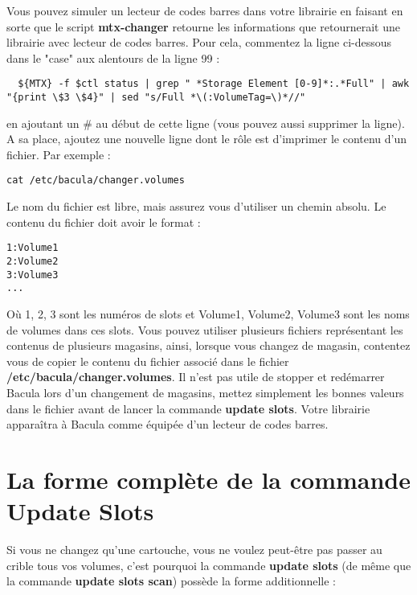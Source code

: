 Vous pouvez simuler un lecteur de codes barres dans votre librairie en faisant 
en sorte que le script {\bf mtx-changer} retourne les informations que 
retournerait une librairie avec lecteur de codes barres. Pour cela, commentez 
la ligne ci-dessous dans le "case" aux alentours de la ligne 99 :

\footnotesize
\begin{verbatim}
  ${MTX} -f $ctl status | grep " *Storage Element [0-9]*:.*Full" | awk "{print \$3 \$4}" | sed "s/Full *\(:VolumeTag=\)*//"
\end{verbatim}
\normalsize

en ajoutant un \# au d\'ebut de cette ligne (vous pouvez aussi supprimer la ligne). 
A sa place, ajoutez une nouvelle ligne dont le r\^ole est d'imprimer le contenu 
d'un fichier. Par exemple :

\footnotesize
\begin{verbatim}
cat /etc/bacula/changer.volumes
\end{verbatim}
\normalsize

Le nom du fichier est libre, mais assurez vous d'utiliser un chemin absolu.
Le contenu du fichier doit avoir le format :

\footnotesize
\begin{verbatim}
1:Volume1
2:Volume2
3:Volume3
...
\end{verbatim}
\normalsize

O\`u 1, 2, 3 sont les num\'eros de slots et Volume1, Volume2, Volume3 sont les 
noms de volumes dans ces slots. Vous pouvez utiliser plusieurs fichiers 
repr\'esentant les contenus de plusieurs magasins, ainsi, lorsque vous 
changez de magasin, contentez vous de copier le contenu du fichier associ\'e 
dans le fichier {\bf /etc/bacula/changer.volumes}. Il n'est pas utile de 
stopper et red\'emarrer Bacula lors d'un changement de magasins, mettez simplement 
les bonnes valeurs dans le fichier avant de lancer la commande {\bf update slots}.
Votre librairie appara\^itra \`a Bacula comme \'equip\'ee d'un lecteur de codes barres.

\label{updateslots}

\section{La forme compl\`ete de la commande Update Slots}

Si vous ne changez qu'une cartouche, vous ne voulez peut-\^etre pas passer au crible 
tous vos volumes, c'est pourquoi la commande {\bf update slots} (de m\^eme que la 
commande {\bf update slots scan}) poss\`ede la forme additionnelle :

